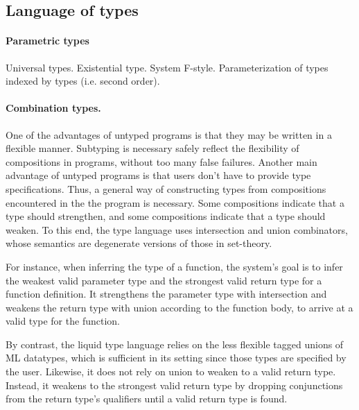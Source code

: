 \documentclass[acmsmall]{acmart}
\begin{document}
\subsection{Language of types}

\paragraph{Parametric types}
Universal types. Existential type. System F-style. Parameterization of types indexed by types (i.e. second order).


\paragraph{Combination types.}
One of the advantages of untyped programs is that they may be written in a flexible manner.
Subtyping is necessary safely reflect the flexibility of compositions in programs, without too many false failures.
Another main advantage of untyped programs is that users don't have to provide type specifications.
Thus, a general way of constructing types from compositions encountered in the the program is necessary.
Some compositions indicate that a type should strengthen, and some compositions indicate that a type should weaken.
To this end, the type language uses intersection and union combinators, 
whose semantics are degenerate versions of those in set-theory.

For instance, when inferring the type of a function, 
the system's goal is to infer the weakest valid parameter type and the strongest valid return type for a function definition.
It strengthens the parameter type with intersection and weakens the return type with union according to the function body,
to arrive at a valid type for the function.  

By contrast, the liquid type language relies on the less flexible tagged unions of ML datatypes, 
which is sufficient in its setting since those types are specified by the user. 
Likewise, it does not rely on union to weaken to a valid return type. 
Instead, it weakens to the strongest valid return type by dropping conjunctions from 
the return type's qualifiers until a valid return type is found.
\end{document}
